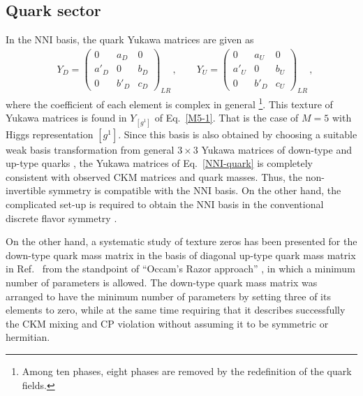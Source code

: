 \documentclass[a4paper,11pt]{article}
\numberwithin{equation}{section}
\begin{document}
\subsection{Quark sector}
In the NNI basis, the quark Yukawa matrices are given as 
\begin{align}
&  Y_D =
\begin{pmatrix}
0  &  a_D &0  \\
a'_D & 0 & b_D \\
0& b'_D& c_D
\end{pmatrix}_{LR}\,,
\qquad
Y_U =
\begin{pmatrix}
0  &  a_U &0  \\
a'_U & 0 & b_U \\
0& b'_D& c_U
\end{pmatrix}_{LR}\,,
\label{NNI-quark}
\end{align}
where the  coefficient of each element is complex in general
\footnote{Among ten phases, eight phases  are removed  
	by the redefinition of the quark fields. }. 
This texture of Yukawa matrices is found in  $Y_{[g^1]}$
of Eq.~\eqref{M5-1}. 
That is the case of  $M=5$ with Higgs representation $[g^1]$.
Since this basis is also obtained by choosing a suitable weak basis transformation from general $3\times 3$ Yukawa matrices 
of down-type and up-type quarks \cite{Branco:1988iq},
the  Yukawa matrices of Eq.~\eqref{NNI-quark} is completely consistent with observed CKM matrices and quark masses.
Thus, the non-invertible symmetry is compatible with the NNI basis.
On the other hand, the complicated set-up is required to obtain
the NNI basis in the conventional discrete flavor symmetry \cite{Kikuchi:2022svo}.

On the other hand,
a systematic study of texture zeros has been presented for the down-type  quark mass matrix in the basis of diagonal up-type quark mass matrix 
in Ref.~\cite{Tanimoto:2016rqy} from  
the standpoint of ``Occam's Razor approach'' \cite{Harigaya:2012bw},
in which a minimum number of parameters is  allowed.
The down-type quark mass matrix was arranged to have the minimum 
number of parameters by 
setting three of its elements to zero, while at the 
same time requiring that it
describes successfully the CKM mixing and CP violation without 
assuming it to be symmetric or hermitian. 
\end{document}

